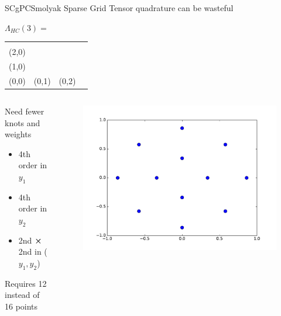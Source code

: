 \documentclass{beamer}
\begin{document}
\begin{frame}{SCgPC}{Smolyak Sparse Grid}%
  Tensor quadrature can be wasteful
    \begin{table}\centering
      $\Lambda_{HC}(3)=$
      \begin{tabular}{|c c c c|} \hline
        \color{red}{(3,0)} &       &       &       \\
        (2,0) &       &       &       \\
        (1,0) & \color{red}{(1,1)} &       &       \\
        (0,0) & (0,1) & (0,2) & \color{red}{(0,3)} \\ \hline
      \end{tabular}
    \end{table}
    \begin{columns}
      \begin{column}{0.6\textwidth}
        Need fewer knots and weights
        \begin{itemize}
          \item 4th order in $y_1$
          \item 4th order in $y_2$
          \item 2nd $\cross$ 2nd in ($y_1,y_2$)
        \end{itemize}
        Requires 12 instead of 16 points
      \end{column}
      \begin{column}{0.4\textwidth}
        \begin{figure}[h!]
          \centering
          \includegraphics[width=\linewidth]{smolyak_quad}
        \end{figure}
      \end{column}
    \end{columns}
\end{frame}
\end{document}
